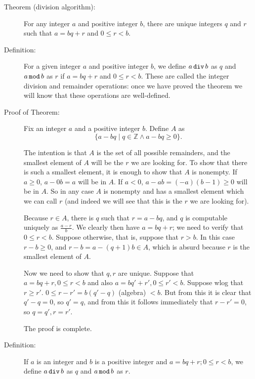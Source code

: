 \documentclass[12pt]{article}
\begin{document}
\begin{description}

\item[Theorem (division algorithm):]  For any integer $a$ and positive integer $b$, there are unique integers $q$ and
$r$ such that $a=bq+r$ and $0\leq r <b$.

\item[Definition:]  For a given integer $a$ and positive integer $b$, we define $a\, {\tt div} \,b$ as $q$
and $a\, {\tt mod}\, b$ as $r$ if $a=bq+r$ and $0 \leq r <b$.  These are called the integer division and remainder operations:  once we have proved the theorem we will know that these operations are well-defined.

\item[Proof of Theorem:]   Fix an integer $a$ and a positive integer $b$.   Define $A$ as $$\{a-bq \mid q \in {\mathbb Z}  \wedge a-bq \geq 0\}.$$ 

The intention is that $A$ is the set of all possible remainders, and the smallest element of $A$ will be the $r$ we are looking for.  To show that there is such a smallest element, it is enough to show that $A$ is nonempty.   If $a \geq 0$,
$a-0b=a$ will be in $A$.   If $a<0$, $a-ab = (-a)(b-1) \geq 0$ will be in $A$.   So in any case $A$ is nonempty
and has a smallest element which we can call $r$ (and indeed we will see that this is the $r$ we are looking for).

Because $r \in A$, there is $q$ such that $r=a-bq$, and $q$ is computable uniquely as $\frac{a-r}b$.
We clearly then have $a=bq+r$; we need to verify that $0 \leq r < b$.   Suppose otherwise, that is, suppose that $r>b$.  In this case $r-b\geq 0$, and $r-b = a-(q+1)b \in A$, which is absurd because $r$ is the smallest element of $A$.

Now we need to show that $q,r$ are unique.   Suppose that $a=bq+r, 0\leq r<b$ and also $a=bq'+r', 0\leq r'<b$.
Suppose wlog that $r \geq r'$.  $0 \leq r-r' = b(q'-q) $ (algebra) $ < b$.   But from this it is clear that $q'-q=0$,
so $q'=q$, and from this it follows immediately that $r-r'=0$, so $q=q', r=r'$.

The proof is complete.

\item[Definition:]  If $a$ is an integer and $b$ is a positive integer and $a=bq+r; 0 \leq r <b$, we define $a \,{\tt div}\, b$ as $q$ and $a\, {\tt mod}\, b$ as $r$.

\end{description}
\end{document}
